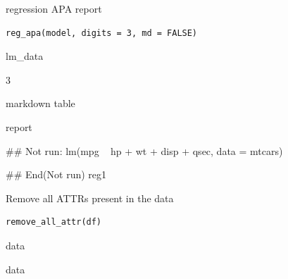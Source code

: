 \documentclass[a4paper]{book}
\begin{document}
%
\begin{Description}
regression APA report
\end{Description}
%
\begin{Usage}
\begin{verbatim}
reg_apa(model, digits = 3, md = FALSE)
\end{verbatim}
\end{Usage}
%
\begin{Arguments}
\begin{ldescription}
\item[\code{model}] lm\_data

\item[\code{digits}] 3

\item[\code{md}] markdown table
\end{ldescription}
\end{Arguments}
%
\begin{Value}
report
\end{Value}
%
\begin{Examples}
\begin{ExampleCode}
\#\# Not run: 
lm(mpg ~ hp + wt + disp + qsec, data = mtcars) %

## End(Not run)
reg1
\end{ExampleCode}
\end{Examples}

%
\begin{Description}
Remove all ATTRs present in the data
\end{Description}
%
\begin{Usage}
\begin{verbatim}
remove_all_attr(df)
\end{verbatim}
\end{Usage}
%
\begin{Arguments}
\begin{ldescription}
\item[\code{df}] data
\end{ldescription}
\end{Arguments}
%
\begin{Value}
data
\end{Value}
\end{document}
